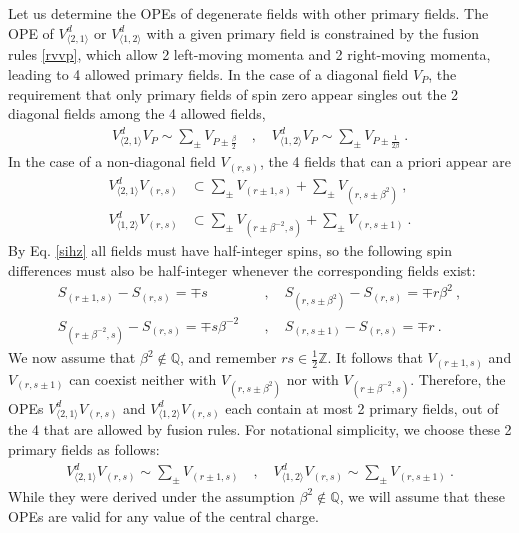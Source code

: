\documentclass[12pt, a4paper]{article}
\begin{document}
Let us determine the OPEs of degenerate fields with other primary fields.
The OPE of $V^d_{\langle 2,1\rangle}$ or $V^d_{\langle 1,2\rangle}$ with a given primary field is constrained by the fusion rules \eqref{rvvp}, which allow 2 left-moving momenta and 2 right-moving momenta, leading to 4 allowed primary fields. In the case of a diagonal field $V_P$, the requirement that only primary fields of spin zero appear singles out the 2 diagonal fields among the 4 allowed fields,
\begin{align}
 \boxed{V^d_{\langle 2,1\rangle} V_P \sim \sum_\pm V_{P\pm\frac{\beta}{2}}} \quad , \quad \boxed{V^d_{\langle 1,2\rangle} V_P \sim \sum_\pm V_{P\pm\frac{1}{2\beta}}} \ . 
 \label{vpope}
\end{align}
In the case of a non-diagonal field $V_{(r,s)}$, the 4 fields that can a priori appear are
\begin{subequations}
\begin{align}
 V^d_{\langle 2,1\rangle}V_{(r,s)} &\subset \sum_\pm V_{(r\pm 1,s)} + \sum_\pm V_{(r,s\pm \beta^2)}\ ,
 \label{vtovrs}
 \\
 V^d_{\langle 1,2\rangle}V_{(r,s)} &\subset \sum_\pm V_{(r\pm \beta^{-2},s)} + \sum_\pm V_{(r,s\pm 1)}\ .
 \label{votvrs}
\end{align}
\end{subequations}
By Eq. \eqref{sihz} all fields must have half-integer spins, so the following spin differences must also be half-integer whenever the corresponding fields exist:
\begin{subequations}
\begin{align}
 S_{(r\pm 1,s)} - S_{(r,s)} = \mp s &\quad , \quad S_{(r,s\pm \beta^2)} - S_{(r,s)} = \mp r\beta^2\ ,
 \label{sdiff1}
 \\
 S_{(r\pm \beta^{-2},s)} - S_{(r,s)} = \mp s\beta^{-2} &\quad , \quad S_{(r,s\pm 1)} - S_{(r,s)} = \mp r\ . 
 \label{sdiff2}
\end{align}
\end{subequations}
We now assume that $\beta^2\notin \mathbb{Q}$, and remember $rs\in\frac12\mathbb{Z}$. It follows that $V_{(r\pm 1,s)}$ and $V_{(r,s\pm 1)}$ can coexist neither with $V_{(r,s\pm \beta^2)}$ nor with $V_{(r\pm \beta^{-2},s)}$. Therefore, the OPEs $V^d_{\langle 2,1\rangle}V_{(r,s)}$ and $V^d_{\langle 1,2\rangle}V_{(r,s)}$ each contain at most 2 primary fields, out of the 4 that are allowed by fusion rules. For notational simplicity, we choose these 2 primary fields as follows: 
\begin{align}
 \boxed{V^d_{\langle 2,1\rangle}V_{(r,s)} \sim \sum_\pm V_{(r\pm 1,s)}} \quad ,\quad
 \boxed{V^d_{\langle 1,2\rangle}V_{(r,s)} \sim \sum_\pm V_{(r,s\pm 1)}}\ . 
 \label{vdvrs}
\end{align}
While they were derived under the assumption $\beta^2\notin \mathbb{Q}$, we will assume that these OPEs are valid for any value of the central charge. 
\end{document}
